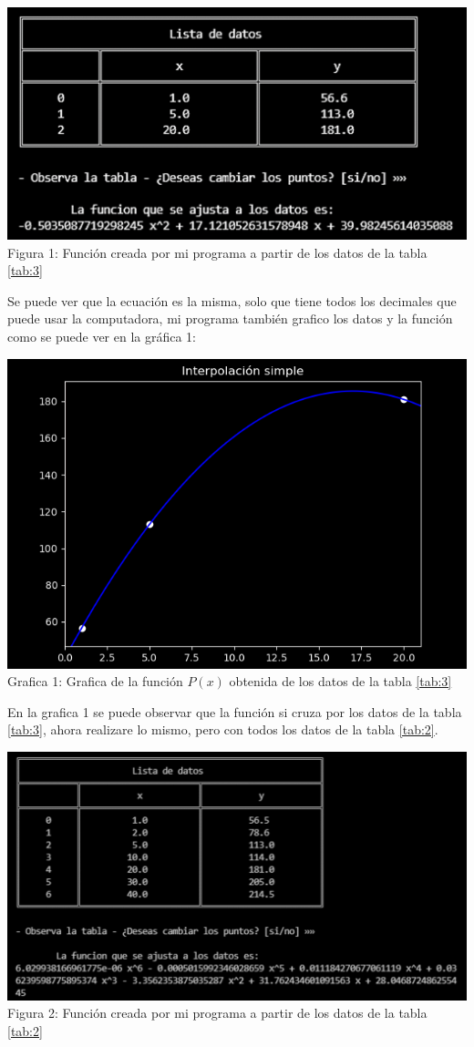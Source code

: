\documentclass[12pt]{article}
\begin{document}
			\begin{center}
				\includegraphics[width=\linewidth]{Figura 1.png}
				Figura 1: Función creada por mi programa a partir de los datos de la tabla \ref{tab:3}
				\label{Fig:1}
			\end{center}
			Se puede ver que la ecuación es la misma, solo que tiene todos los decimales que puede usar la computadora, mi programa 
			también grafico los datos y la función como se puede ver en la gráfica 1:
			\begin{center}
				\includegraphics[width=.9\linewidth]{Grafica 1.png}\\
				Grafica 1: Grafica de la función $ P(x) $ obtenida de los datos de la tabla \ref{tab:3}
			\end{center}
			En la grafica 1 se puede observar que la función si cruza por los datos de la tabla \ref{tab:3}, ahora realizare 
			lo mismo, pero con todos los datos de la tabla \ref{tab:2}.
			\begin{center}
				\includegraphics[width=\linewidth]{Figura 2.png}
				Figura 2: Función creada por mi programa a partir de los datos de la tabla \ref{tab:2}
				\label{Fig:2} 			
			\end{center}
\end{document}

